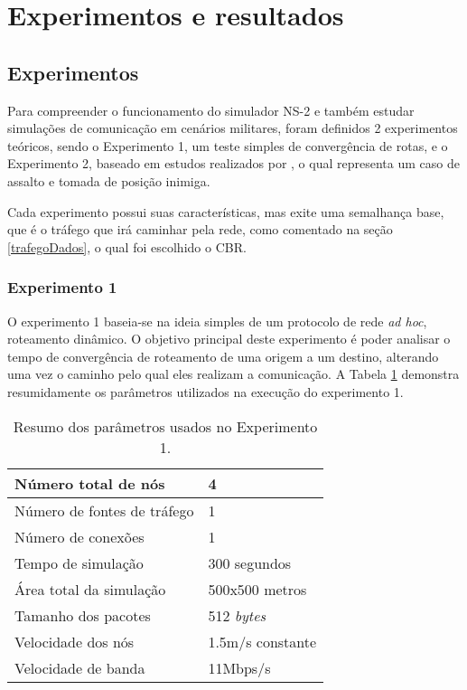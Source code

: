 \section{Experimentos e resultados}
\subsection{Experimentos}
Para compreender o funcionamento do simulador NS-2 e tamb\'em estudar simula\c{c}\~oes de comunica\c{c}\~ao em cen\'arios militares, foram definidos 2 experimentos te\'oricos, sendo o Experimento 1, um teste simples de converg\^encia de rotas, e o Experimento 2, baseado em estudos realizados por \cite{pereira}, o qual representa um caso de assalto e tomada de posi\c{c}\~ao inimiga.

Cada experimento possui suas caracter\'isticas, mas exite uma semalhan\c{c}a base, que \'e o tr\'afego que ir\'a caminhar pela rede, como comentado na se\c{c}\~ao \ref{trafegoDados}, o qual foi escolhido o CBR.

\subsubsection{Experimento 1}
O experimento 1 baseia-se na ideia simples de um protocolo de rede \textit{ad hoc}, roteamento din\^amico.
O objetivo principal deste experimento \'e poder analisar o tempo de converg\^encia de roteamento de uma origem a um destino, alterando uma vez o caminho pelo qual eles realizam a comunica\c{c}\~ao.
A Tabela \ref{tabParamExp1} demonstra resumidamente os par\^ametros utilizados na execu\c{c}\~ao do experimento 1.

\begin{table}[H]
	\centering
	\caption{Resumo dos par\^ametros usados no Experimento 1.}
	\begin{tabular}{ | l | l | }
		\hline
		N\'umero total de n\'os & 4 \\ \hline
		N\'umero de fontes de tr\'afego & 1 \\ \hline
		N\'umero de conex\~oes & 1 \\ \hline
		Tempo de simula\c{c}\~ao & 300 segundos \\ \hline
		\'Area total da simula\c{c}\~ao & 500x500 metros \\ \hline
		Tamanho dos pacotes & 512 \textit{bytes} \\ \hline	
		Velocidade dos n\'os & 1.5m/s constante \\ \hline
		Velocidade de banda & 11Mbps/s \\ \hline
	\end{tabular}
	\label{tabParamExp1}
\end{table}

